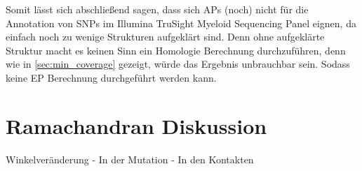 Somit lässt sich abschließend sagen, dass sich \ac{APs} (noch) nicht für die Annotation von \ac{SNPs} im Illumina TruSight Myeloid Sequencing Panel eignen, da einfach noch zu wenige Strukturen aufgeklärt sind. Denn ohne aufgeklärte Struktur macht es keinen Sinn ein Homologie Berechnung durchzuführen, denn wie in \ref{sec:min_coverage} gezeigt, würde das Ergebnis unbrauchbar sein. Sodass keine \ac{EP} Berechnung durchgeführt werden kann. 


\section{Ramachandran Diskussion}

Winkelveränderung
- In der Mutation
- In den Kontakten